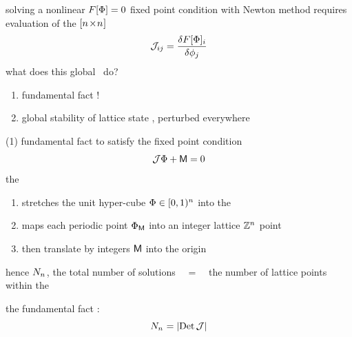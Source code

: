 \begin{frame}{\jacobianOrb}
solving a nonlinear $F[\Phi]=0$ fixed point condition
with Newton method requires evaluation of
the $[{n_{}}\!\times\!{n_{}}]$ {\color{blue}\jacobianOrb}
\[
{\cal J}_{ij} =\frac{\delta F[\Phi]_i}{\delta \phi_j}
\] %
what does this global \jacobianOrb\ do?
\bigskip

\begin{enumerate}
              \item
fundamental fact !
              \item
global stability of lattice state \Xx, perturbed everywhere
            \end{enumerate}
\end{frame}

\begin{frame}{(1) fundamental fact}
to satisfy the fixed point condition
\[
{\cal J}\Phi+\mathsf{M} = 0
\]
the
 {\jacobianOrb} \jMorb\
\begin{enumerate}
              \item
stretches the unit hyper-cube $\Phi\in[0,1)^{n_{}}$ into the \cl{}\dmn\
{\color{blue}\fundPip}
              \item
maps each periodic point ${\Phi}_{\mathsf{M}}$ into an integer lattice
$\mathbb{Z}^{n_{}}$ point
              \item
then translate by integers $\mathsf{M}$ into the origin
            \end{enumerate}
hence $N_{n_{}}$, the total number of solutions ~~=~~ the number of
{\color{blue}lattice points} within the {\fundPip}

\bigskip

the {\color{blue}fundamental fact} :
\[
N_{n_{}} = |\mbox{\rm Det}\,{\cal J}|
\] %
\end{frame}

